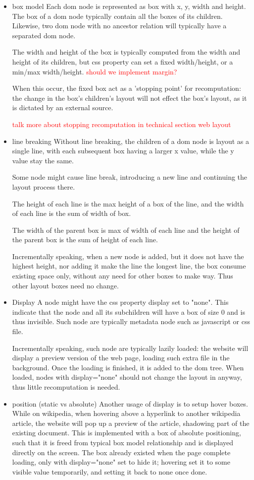 \documentclass[format=acmsmall, review=false, screen=true]{acmart}
\newcommand\todo[1]{\textcolor{red}{#1}}
\begin{document}
\begin{itemize}
	\item box model
	Each dom node is represented as box with x, y, width and height. The box of a dom node typically contain all the boxes of its children. Likewise, two dom node with no ancestor relation will typically have a separated dom node.
	
	The width and height of the box is typically computed from the width and height of its children, but css property can set a fixed width/height, or a min/max width/height. \todo{should we implement margin?}
	
	When this occur, the fixed box act as a 'stopping point' for recomputation: the change in the box's children's layout will not effect the box's layout, as it is dictated by an external source. 
	
	\todo{talk more about stopping recomputation in technical section web layout}
	\item line breaking
	Without line breaking, the children of a dom node is layout as a single line, with each subsequent box having a larger x value, while the y value stay the same. 
	
	Some node might cause line break, introducing a new line and continuing the layout process there.
	
	The height of each line is the max height of a box of the line, and the width of each line is the sum of width of box.
	
	The width of the parent box is max of width of each line and the height of the parent box is the sum of height of each line.
	
	Incrementally speaking, when a new node is added, but it does not have the highest height, nor adding it make the line the longest line, the box consume existing space only, without any need for other boxes to make way. Thus other layout boxes need no change.
	\item Display
	A node might have the css property display set to "none". This indicate that the node and all its subchildren will have a box of size 0 and is thus invisible. Such node are typically metadata node such as javascript or css file. 
	
	Incrementally speaking, such node are typically lazily loaded: the website will display a preview version of the web page, loading such extra file in the background. Once the loading is finished, it is added to the dom tree. When loaded, nodes with display="none" should not change the layout in anyway, thus little recomputation is needed.
	\item position (static vs absolute)
	Another usage of display is to setup hover boxes. While on wikipedia, when hovering above a hyperlink to another wikipedia article, the website will pop up a preview of the article, shadowing part of the existing document. This is implemented with a box of absolute positioning, such that it is freed from typical box model relationship and is displayed directly on the screen. The box already existed when the page complete loading, only with display="none" set to hide it; hovering set it to some visible value temporarily, and setting it back to none once done.
	

\end{itemize}
\end{document}
